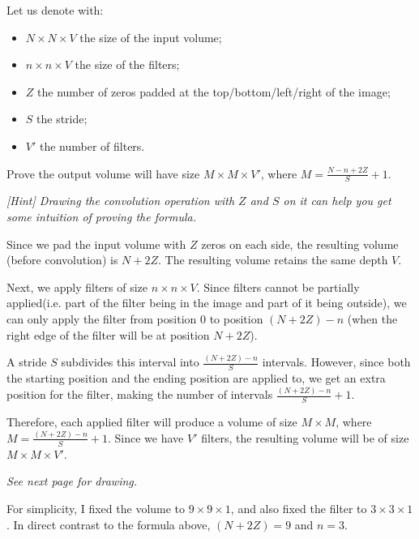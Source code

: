 \documentclass[11pt, reqno]{amsart}
\begin{document}
\newpage
\begin{problem}[1]
  Let us denote with:
  \begin{itemize}
    \item $N \times N\times V$ the size of the input volume;
    \item $n \times n \times V$ the size of the filters;
    \item $Z$ the number of zeros padded at the top/bottom/left/right of the image;
    \item $S$ the stride;
    \item $V'$ the number of filters.
  \end{itemize}
  Prove the output volume will have size $M \times M \times V'$,
  where $M = \frac{N - n+2Z}{S} + 1$.

  \step
  \emph{
    [Hint] Drawing the convolution operation with $Z$ and $S$ on it
    can help you get some intuition of proving the formula.
  }

  \step
  \begin{enumarabic}
    \item Since we pad the input volume with $Z$ zeros on each side,
      the resulting volume (before convolution) is $N + 2Z$.
      The resulting volume retains the same depth $V$.
    \item Next, we apply filters of size $n \times n \times V$.
      Since filters cannot be partially applied(i.e. part of the filter being in the
      image and part of it being outside), we can only apply the filter
      from position $0$ to position $(N + 2Z) - n$ (when the right edge of the filter
      will be at position $N + 2Z$).
    \item A stride $S$ subdivides this interval into $\frac{(N + 2Z) - n}{S}$ intervals.
      However, since both the starting position and the ending position are
      applied to, we get an extra position for the filter, making
      the number of intervals $\frac{(N + 2Z) - n}{S} + 1$.
    \item Therefore, each applied filter will produce a volume of size
      $M \times M$, where $M = \frac{(N + 2Z) - n}{S} + 1$.
      Since we have $V'$ filters, the resulting volume will be of size
      $M \times M \times V'$.

      \step
      \emph{See next page for drawing.}
  \end{enumarabic}

  \newpage
  For simplicity, I fixed the volume to $9 \times 9 \times 1$, and
  also fixed the filter to $3 \times 3 \times 1$.
  In direct contrast to the formula above, $(N + 2Z) = 9$ and $n = 3$.


\end{problem}
\end{document}
